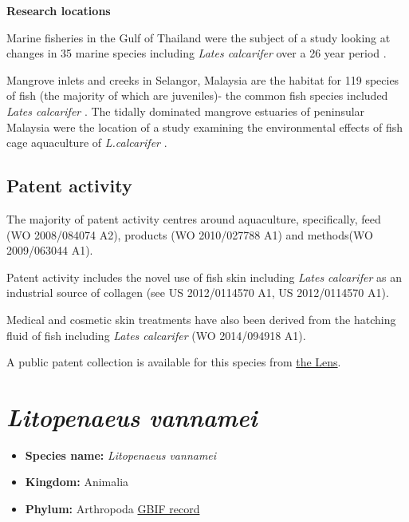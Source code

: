 \documentclass[]{book}
\providecommand{\tightlist}{%
  \setlength{\itemsep}{0pt}\setlength{\parskip}{0pt}}
\theoremstyle{definition}
\theoremstyle{definition}
\theoremstyle{definition}
\theoremstyle{remark}
\begin{document}
\textbf{Research locations}

Marine fisheries in the Gulf of Thailand were the subject of a study
looking at changes in 35 marine species including \emph{Lates
calcarifer} over a 26 year period \citep{Tuantong_2015}.

Mangrove inlets and creeks in Selangor, Malaysia are the habitat for 119
species of fish (the majority of which are juveniles)- the common fish
species included \emph{Lates calcarifer} \citep{Sasekumar_1992}. The
tidally dominated mangrove estuaries of peninsular Malaysia were the
location of a study examining the environmental effects of fish cage
aquaculture of \emph{L.calcarifer} \citep{Alongi_2003}.

\hypertarget{patent-activity-1}{%
\subsection{Patent activity}\label{patent-activity-1}}

The majority of patent activity centres around aquaculture,
specifically, feed (WO 2008/084074 A2), products (WO 2010/027788 A1) and
methods(WO 2009/063044 A1).

Patent activity includes the novel use of fish skin including
\emph{Lates calcarifer} as an industrial source of collagen (see US
2012/0114570 A1, US 2012/0114570 A1).

Medical and cosmetic skin treatments have also been derived from the
hatching fluid of fish including \emph{Lates calcarifer} (WO 2014/094918
A1).

A public patent collection is available for this species from
\href{https://www.lens.org/lens/collection/25319}{the Lens}.

\hypertarget{litopenaeus-vannamei}{%
\section{\texorpdfstring{\emph{Litopenaeus
vannamei}}{Litopenaeus vannamei}}\label{litopenaeus-vannamei}}

\begin{itemize}
\tightlist
\item
  \textbf{Species name:} \emph{Litopenaeus vannamei}
\item
  \textbf{Kingdom:} Animalia
\item
  \textbf{Phylum:} Arthropoda
  \href{https://www.gbif.org/species/2223871}{GBIF record}
\end{itemize}
\end{document}
